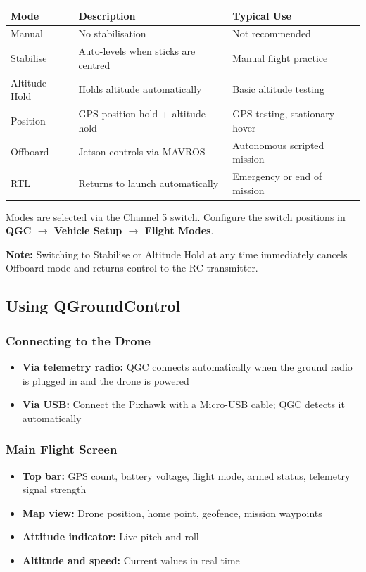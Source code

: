 \documentclass{article}
\begin{document}
\begin{tabular}{lll}
\toprule
\textbf{Mode} & \textbf{Description} & \textbf{Typical Use} \\
\midrule
Manual & No stabilisation & Not recommended \\
Stabilise & Auto-levels when sticks are centred & Manual flight practice \\
Altitude Hold & Holds altitude automatically & Basic altitude testing \\
Position & GPS position hold + altitude hold & GPS testing, stationary hover \\
Offboard & Jetson controls via MAVROS & Autonomous scripted mission \\
RTL & Returns to launch automatically & Emergency or end of mission \\
\bottomrule
\end{tabular}

Modes are selected via the Channel 5 switch. Configure the switch positions in \textbf{QGC $\rightarrow$ Vehicle Setup $\rightarrow$ Flight Modes}.

\textbf{Note:} Switching to Stabilise or Altitude Hold at any time immediately cancels Offboard mode and returns control to the RC transmitter.

\subsection{Using QGroundControl}
\label{sec:qgc}

\subsubsection{Connecting to the Drone}
\begin{itemize}
    \item \textbf{Via telemetry radio:} QGC connects automatically when the ground radio is plugged in and the drone is powered
    \item \textbf{Via USB:} Connect the Pixhawk with a Micro-USB cable; QGC detects it automatically
\end{itemize}

\subsubsection{Main Flight Screen}
\begin{itemize}
    \item \textbf{Top bar:} GPS count, battery voltage, flight mode, armed status, telemetry signal strength
    \item \textbf{Map view:} Drone position, home point, geofence, mission waypoints
    \item \textbf{Attitude indicator:} Live pitch and roll
    \item \textbf{Altitude and speed:} Current values in real time
\end{itemize}
\end{document}
